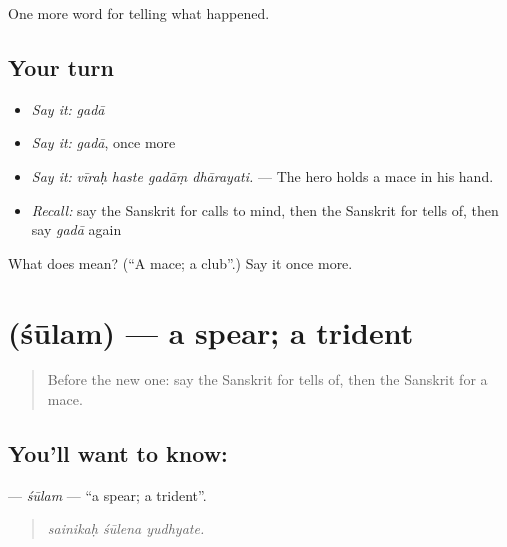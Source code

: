 \begin{grammarlens}[title={What you've built}]
One more word for telling what happened.
\end{grammarlens}

\subsection*{Your turn}
\begin{itemize}
\raggedright
  \item \emph{Say it:} \emph{gadā}
  \item \emph{Say it:} \emph{gadā}, once more
  \item \emph{Say it:} \emph{vīraḥ haste gadāṃ dhārayati.} — The hero holds a mace in his hand.
  \item \emph{Recall:} say the Sanskrit for calls to mind, then the Sanskrit for tells of, then say \emph{gadā} again
\end{itemize}

\begin{tcolorbox}[breakable,colback=teal!4,colframe=teal!35!black,title={Before you move on}]
What does  mean? (\textquotedblleft{}A mace; a club\textquotedblright{}.) Say it once more.
\end{tcolorbox}
\section[\texorpdfstring{\sk{शूलम्} (śūlam)}{शूलम् (śūlam)}]{ (śūlam) — a spear; a trident}

\label{lesson:SA-C325-sulam}



\begin{quote}
Before the new one: say the Sanskrit for tells of, then the Sanskrit for a mace.
\end{quote}

\subsection*{You'll want to know: }
\textbf{} — \emph{śūlam} — \textquotedblleft{}a spear; a trident\textquotedblright{}.

\begin{quote}
  
\end{quote}

\begin{quote}
\emph{sainikaḥ śūlena yudhyate.}
\end{quote}

